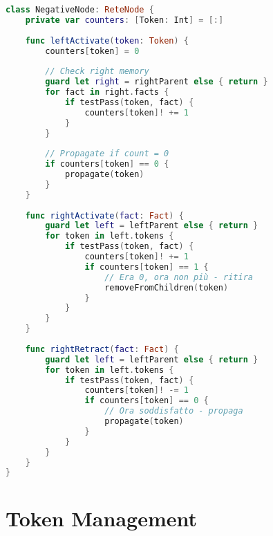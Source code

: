 \begin{lstlisting}[language=Swift]
class NegativeNode: ReteNode {
    private var counters: [Token: Int] = [:]
    
    func leftActivate(token: Token) {
        counters[token] = 0
        
        // Check right memory
        guard let right = rightParent else { return }
        for fact in right.facts {
            if testPass(token, fact) {
                counters[token]! += 1
            }
        }
        
        // Propagate if count = 0
        if counters[token] == 0 {
            propagate(token)
        }
    }
    
    func rightActivate(fact: Fact) {
        guard let left = leftParent else { return }
        for token in left.tokens {
            if testPass(token, fact) {
                counters[token]! += 1
                if counters[token] == 1 {
                    // Era 0, ora non più - ritira
                    removeFromChildren(token)
                }
            }
        }
    }
    
    func rightRetract(fact: Fact) {
        guard let left = leftParent else { return }
        for token in left.tokens {
            if testPass(token, fact) {
                counters[token]! -= 1
                if counters[token] == 0 {
                    // Ora soddisfatto - propaga
                    propagate(token)
                }
            }
        }
    }
}
\end{lstlisting}

\section{Token Management}

